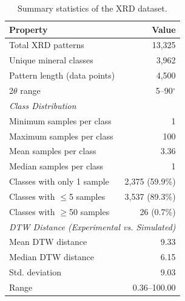 
\begin{table}[htbp]
\centering
\caption{Summary statistics of the XRD dataset.}
\label{tab:dataset_stats}
\begin{tabular}{lr}
\toprule
\textbf{Property} & \textbf{Value} \\
\midrule
Total XRD patterns & 13,325 \\
Unique mineral classes & 3,962 \\
Pattern length (data points) & 4,500 \\
2$\theta$ range & 5--90$^\circ$ \\
\midrule
\multicolumn{2}{l}{\textit{Class Distribution}} \\
\midrule
Minimum samples per class & 1 \\
Maximum samples per class & 100 \\
Mean samples per class & 3.36 \\
Median samples per class & 1 \\
Classes with only 1 sample & 2,375 (59.9\%) \\
Classes with $\leq$5 samples & 3,537 (89.3\%) \\
Classes with $\geq$50 samples & 26 (0.7\%) \\
\midrule
\multicolumn{2}{l}{\textit{DTW Distance (Experimental vs. Simulated)}} \\
\midrule
Mean DTW distance & 9.33 \\
Median DTW distance & 6.15 \\
Std. deviation & 9.03 \\
Range & 0.36--100.00 \\
\bottomrule
\end{tabular}
\end{table}
